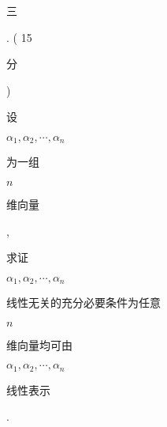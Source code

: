 \documentclass[10pt]{article}
\begin{document}
\begin{CJK}{UTF8}{mj}三\end{CJK}. ( 15 \begin{CJK}{UTF8}{mj}分\end{CJK}) \begin{CJK}{UTF8}{mj}设\end{CJK} $\alpha_{1}, \alpha_{2}, \cdots, \alpha_{n}$ \begin{CJK}{UTF8}{mj}为一组\end{CJK} $n$ \begin{CJK}{UTF8}{mj}维向量\end{CJK}, \begin{CJK}{UTF8}{mj}求证\end{CJK} $\alpha_{1}, \alpha_{2}, \cdots, \alpha_{n}$ \begin{CJK}{UTF8}{mj}线性无关的充分必要条件为任意\end{CJK} $n$ \begin{CJK}{UTF8}{mj}维向量均可由\end{CJK} $\alpha_{1}, \alpha_{2}, \cdots, \alpha_{n}$ \begin{CJK}{UTF8}{mj}线性表示\end{CJK}.
\end{document}
